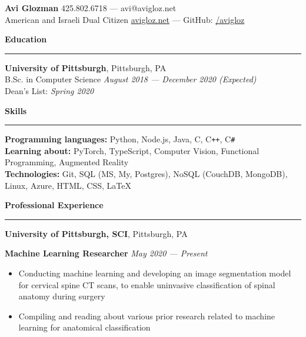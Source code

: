 \documentclass[11pt]{article}
\begin{document}
	\pagestyle{empty}
	\begin{center}
		{\huge \textbf{Avi Glozman}} {\large \hfill 425.802.6718 --- avi@avigloz.net}\\
		\vspace{1.25mm}
		{\large American and Israeli Dual Citizen \hfill \href{https://avigloz.net}{avigloz.net} --- GitHub: \href{https://github.com/avigloz}{/avigloz}}
	\end{center}
	
	\begin{flushleft}
		
		\vspace{-1.65mm}
		{\large \raggedright \textbf{Education}}
		\vspace{1.25mm}
	
		\hrule
		
		\vspace{2.25mm}
		\textbf{University of Pittsburgh}, Pittsburgh, PA\\
		{\small B.Sc. in Computer Science \hfill \textit{August 2018 --- December 2020 (Expected)}}\\
		{\small Dean's List: \textit{Spring 2020}}
	
		\vspace{1.5mm}
		{\large \raggedright \textbf{Skills}}
		\vspace{1.25mm}
	
		\hrule
	
		\vspace{2.25mm}
		\textbf{Programming languages:} Python, Node.js, Java, C, C\texttt{++}, C\verb!#!\\
		\vspace{0.5mm}
		\textbf{Learning about:} PyTorch, TypeScript, Computer Vision, Functional Programming, Augmented Reality\\
		\vspace{0.5mm}
		\textbf{Technologies:} Git, SQL (MS, My, Postgres), NoSQL (CouchDB, MongoDB), Linux, Azure, HTML, CSS, \LaTeX\\

		\vspace{1.5mm}
		{\large \raggedright \textbf{Professional Experience}}
		\vspace{1.25mm}
	
		\hrule

		\vspace{2.25mm}
		\textbf{University of Pittsburgh, SCI}, Pittsburgh, PA\\
		\begin{leftline}[colback=gray]
			{\small \textbf{Machine Learning Researcher}} \hfill \textit{\small May 2020 --- Present}
			\begin{itemize}
				\item Conducting machine learning and developing an image segmentation model for cervical spine CT scans, to enable uninvasive classification of spinal anatomy during surgery
				\vspace{-2mm}
				\item Compiling and reading about various prior research related to machine learning for anatomical classification
			\end{itemize}
		\end{leftline}


\end{flushleft}
\end{document}
